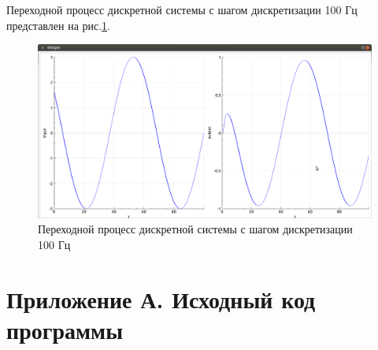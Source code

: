 \documentclass[14pt,a4paper]{extreport}
\begin{document}
Переходной процесс дискретной системы с шагом дискретизации 
100 Гц представлен на рис.\ref{fig:discrete100}.

\begin{figure}[h]
    \centering
    \includegraphics[width=160mm]{img/100hz.png}
    \caption{Переходной процесс дискретной системы 
    с шагом дискретизации 100 Гц}
    \label{fig:discrete100}
\end{figure}


\newpage
\chapter*{Приложение А. Исходный код программы}
\end{document}
